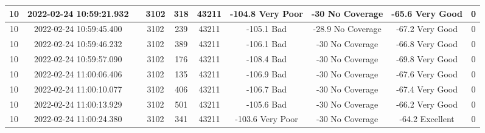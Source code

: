 \begin{longtable*}{|c|c|c|c|c|c|c|c|c|c|}
10&2022-02-24 10:59:21.932&&3102&318&43211& -104.8    Very Poor   & -30       No Coverage & -65.6     Very Good   & 0\\\hline
{}10&2022-02-24 10:59:45.400&&3102&239&43211& -105.1    Bad         & -28.9     No Coverage & -67.2     Very Good   & 0\\\hline
{}10&2022-02-24 10:59:46.232&&3102&389&43211& -106.1    Bad         & -30       No Coverage & -66.8     Very Good   & 0\\\hline
{}10&2022-02-24 10:59:57.090&&3102&176&43211& -108.4    Bad         & -30       No Coverage & -69.8     Very Good   & 0\\\hline
{}10&2022-02-24 11:00:06.406&&3102&135&43211& -106.9    Bad         & -30       No Coverage & -67.6     Very Good   & 0\\\hline
{}10&2022-02-24 11:00:10.077&&3102&406&43211& -106.7    Bad         & -30       No Coverage & -67.4     Very Good   & 0\\\hline
{}10&2022-02-24 11:00:13.929&&3102&501&43211& -105.6    Bad         & -30       No Coverage & -66.2     Very Good   & 0\\\hline
{}10&2022-02-24 11:00:24.380&&3102&341&43211& -103.6    Very Poor   & -30       No Coverage & -64.2     Excellent   & 0\\\hline

\end{longtable*}

